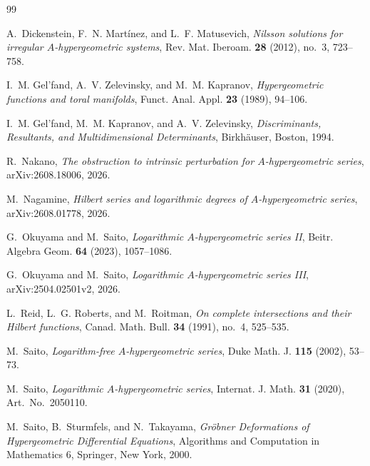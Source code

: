 \begin{thebibliography}{99}

	A.~Dickenstein, F.~N. Mart\'inez, and L.~F. Matusevich,
	\emph{Nilsson solutions for irregular \(A\)-hypergeometric systems}, Rev. Mat. Iberoam. \textbf{28} (2012), no.~3, 723--758.

	I.~M. Gel'fand, A.~V. Zelevinsky, and M.~M. Kapranov,
	\emph{Hypergeometric functions and toral manifolds},
	Funct. Anal. Appl. \textbf{23} (1989), 94--106.

	I.~M. Gel'fand, M.~M. Kapranov, and A.~V. Zelevinsky,
	\emph{Discriminants, Resultants, and Multidimensional Determinants},
	Birkh\"auser, Boston, 1994.

	R.~Nakano,
	\emph{The obstruction to intrinsic perturbation for \(A\)-hypergeometric series},
	arXiv:2608.18006, 2026.

	M.~Nagamine,
	\emph{Hilbert series and logarithmic degrees of \(A\)-hypergeometric series}, arXiv:2608.01778, 2026.

	G.~Okuyama and M.~Saito,
	\emph{Logarithmic \(A\)-hypergeometric series II}, Beitr. Algebra Geom. \textbf{64} (2023), 1057--1086.

	G.~Okuyama and M.~Saito,
	\emph{Logarithmic \(A\)-hypergeometric series III}, arXiv:2504.02501v2, 2026.

	L.~Reid, L.~G. Roberts, and M.~Roitman,
	\emph{On complete intersections and their Hilbert functions},
	Canad. Math. Bull. \textbf{34} (1991), no.~4, 525--535.

	M.~Saito,
	\emph{Logarithm-free \(A\)-hypergeometric series}, Duke Math. J. \textbf{115} (2002), 53--73.

	M.~Saito,
	\emph{Logarithmic \(A\)-hypergeometric series}, Internat. J. Math. \textbf{31} (2020), Art.~No.~2050110.

	M.~Saito, B.~Sturmfels, and N.~Takayama,
	\emph{Gr\"obner Deformations of Hypergeometric Differential
		Equations},
	Algorithms and Computation in Mathematics 6, Springer, New York,
	2000.

\end{thebibliography}

